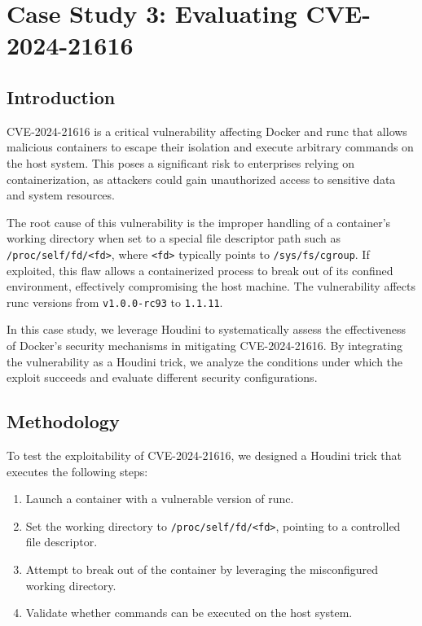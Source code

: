 \section{Case Study 3: Evaluating CVE-2024-21616}

\subsection{Introduction}
CVE-2024-21616 is a critical vulnerability affecting Docker and runc that allows malicious containers to escape their isolation and execute arbitrary commands on the host system. This poses a significant risk to enterprises relying on containerization, as attackers could gain unauthorized access to sensitive data and system resources. 

The root cause of this vulnerability is the improper handling of a container’s working directory when set to a special file descriptor path such as \texttt{/proc/self/fd/<fd>}, where \texttt{<fd>} typically points to \texttt{/sys/fs/cgroup}. If exploited, this flaw allows a containerized process to break out of its confined environment, effectively compromising the host machine. The vulnerability affects runc versions from \texttt{v1.0.0-rc93} to \texttt{1.1.11}.

In this case study, we leverage Houdini to systematically assess the effectiveness of Docker’s security mechanisms in mitigating CVE-2024-21616. By integrating the vulnerability as a Houdini trick, we analyze the conditions under which the exploit succeeds and evaluate different security configurations.

\subsection{Methodology}
To test the exploitability of CVE-2024-21616, we designed a Houdini trick that executes the following steps:
\begin{enumerate}
    \item Launch a container with a vulnerable version of runc.
    \item Set the working directory to \texttt{/proc/self/fd/<fd>}, pointing to a controlled file descriptor.
    \item Attempt to break out of the container by leveraging the misconfigured working directory.
    \item Validate whether commands can be executed on the host system.
\end{enumerate}

